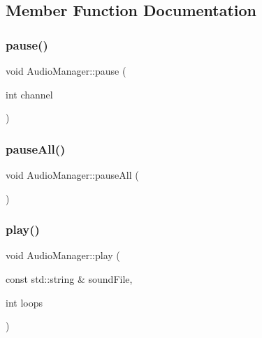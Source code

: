\subsection{Member Function Documentation}
\mbox{\label{classsage_1_1AudioManager_a6e851147d522d6dc255fc0b1f0134832}} 
\subsubsection{\texorpdfstring{pause()}{pause()}}
{\footnotesize\ttfamily void Audio\+Manager\+::pause (\begin{DoxyParamCaption}\item[{int}]{channel }\end{DoxyParamCaption})}

\mbox{\label{classsage_1_1AudioManager_aae16a9d852718c100659b185f86533b3}} 
\subsubsection{\texorpdfstring{pauseAll()}{pauseAll()}}
{\footnotesize\ttfamily void Audio\+Manager\+::pause\+All (\begin{DoxyParamCaption}{ }\end{DoxyParamCaption})}

\mbox{\label{classsage_1_1AudioManager_a251df80c76c4c4031015c4681a2d0c0f}} 
\subsubsection{\texorpdfstring{play()}{play()}\hspace{0.1cm}{\footnotesize\ttfamily [1/2]}}
{\footnotesize\ttfamily void Audio\+Manager\+::play (\begin{DoxyParamCaption}\item[{const std\+::string \&}]{sound\+File,  }\item[{int}]{loops }\end{DoxyParamCaption})}

